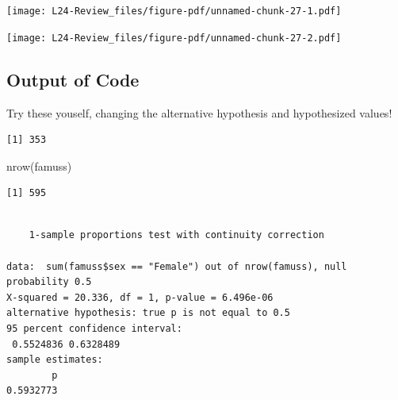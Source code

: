 \documentclass[
  letterpaper,
  DIV=11,
  numbers=noendperiod,
  oneside]{scrreprt}
\newenvironment{Shaded}{\begin{snugshade}}{\end{snugshade}}
\newcommand{\AttributeTok}[1]{\textcolor[rgb]{0.40,0.45,0.13}{#1}}
\newcommand{\CommentTok}[1]{\textcolor[rgb]{0.37,0.37,0.37}{#1}}
\newcommand{\FloatTok}[1]{\textcolor[rgb]{0.68,0.00,0.00}{#1}}
\newcommand{\FunctionTok}[1]{\textcolor[rgb]{0.28,0.35,0.67}{#1}}
\newcommand{\NormalTok}[1]{\textcolor[rgb]{0.00,0.23,0.31}{#1}}
\newcommand{\SpecialCharTok}[1]{\textcolor[rgb]{0.37,0.37,0.37}{#1}}
\newcommand{\StringTok}[1]{\textcolor[rgb]{0.13,0.47,0.30}{#1}}
\begin{document}
\texttt{[image: L24-Review\_files/figure-pdf/unnamed-chunk-27-1.pdf]}

\texttt{[image: L24-Review\_files/figure-pdf/unnamed-chunk-27-2.pdf]}

\hypertarget{output-of-code}{%
\subsection{Output of Code}\label{output-of-code}}

Try these youself, changing the alternative hypothesis and hypothesized
values!

\begin{Shaded}
\end{Shaded}

\begin{verbatim}
[1] 353
\end{verbatim}

\begin{Shaded}
\begin{Highlighting}[]
\FunctionTok{nrow}\NormalTok{(famuss)}
\end{Highlighting}
\end{Shaded}

\begin{verbatim}
[1] 595
\end{verbatim}

\begin{Shaded}
\end{Shaded}

\begin{verbatim}

    1-sample proportions test with continuity correction

data:  sum(famuss$sex == "Female") out of nrow(famuss), null probability 0.5
X-squared = 20.336, df = 1, p-value = 6.496e-06
alternative hypothesis: true p is not equal to 0.5
95 percent confidence interval:
 0.5524836 0.6328489
sample estimates:
        p 
0.5932773 
\end{verbatim}
\end{document}
